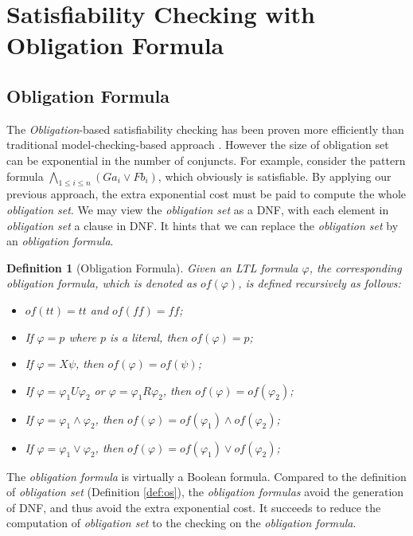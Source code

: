 \documentclass[conference]{IEEEtran}
\newtheorem{definition}{Definition}
\def\phi{\varphi}
\def\ff{\mathit{ff}}
\def\tt{\mathit{tt}}
\def\of#1{\mathit{of}(#1)}
\begin{document}
\section{Satisfiability Checking with Obligation Formula}\label{sec:of}

\subsection{Obligation Formula}


The \textit{Obligation}-based satisfiability checking has been proven more efficiently than 
traditional model-checking-based approach \cite{LZPVH13}. However the size of obligation set 
can be exponential in the number of conjuncts. 
For example, consider the pattern formula 
$\bigwedge_{1\leq i\leq n} (G a_i\vee F b_i)$, which obviously is satisfiable. 
By applying our previous approach, the extra exponential cost must be paid to compute the 
whole \textit{obligation set}. We may view the \textit{obligation set} 
as a DNF, with  each element in \textit{obligation set} a clause in DNF. 
It hints that we can replace the \textit{obligation set} by an \textit{obligation formula}.

\begin{definition}[Obligation Formula]\label{def:of}
Given an LTL formula $\phi$, the corresponding \textit{obligation formula}, 
which is denoted as $\of{\phi}$, is defined recursively as follows:
     \begin{itemize}
       \item $\of{\tt}=\tt$ and $\of{\ff}=\ff$;
       \item If $\phi = p$ where $p$ is a literal, then $\of{\phi} = p$;
       \item If $\phi = X\psi$, then $\of{\phi} = \of{\psi}$;
       \item If $\phi = \phi_1 U \phi_2$ or $\phi = \phi_1 R \phi_2$, then $\of{\phi} = \of{\phi_2}$;
       \item If $\phi = \phi_1 \wedge \phi_2$, then $\of{\phi} = \of{\phi_1} \wedge \of{\phi_2}$;
       \item If $\phi = \phi_1 \vee \phi_2$, then $\of{\phi} = \of{\phi_1} \vee \of{\phi_2}$;
     \end{itemize}
\end{definition}

The \textit{obligation formula} is virtually a Boolean formula.
Compared to the definition of \textit{obligation set} (Definition
\ref{def:os}), the \textit{obligation formulas} avoid the generation
of DNF, and thus avoid the extra exponential cost. It succeeds to
reduce the computation of \textit{obligation set} to the checking on
the \textit{obligation formula}.
\end{document}
